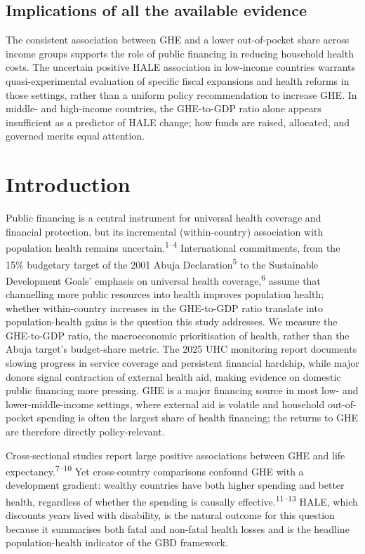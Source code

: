 \documentclass[12pt,a4paper]{article}
\begin{document}
\subsection*{Implications of all the available evidence}
The consistent association between GHE and a lower out-of-pocket share across
income groups supports the role of public financing in reducing household
health costs. The uncertain positive HALE association in low-income countries
warrants quasi-experimental evaluation of specific fiscal expansions and
health reforms in those settings, rather than a uniform policy
recommendation to increase GHE. In middle- and high-income countries, the
GHE-to-GDP ratio alone appears insufficient as a predictor of HALE change;
how funds are raised, allocated, and governed merits equal attention.


\section*{Introduction}

Public financing is a central instrument for universal health coverage and financial protection, but its incremental (within-country) association with population health remains uncertain.\textsuperscript{1--4} International commitments, from the 15\% budgetary target of the 2001 Abuja Declaration\textsuperscript{5} to the Sustainable Development Goals' emphasis on universal health coverage,\textsuperscript{6} assume that channelling more public resources into health improves population health; whether within-country increases in the GHE-to-GDP ratio translate into population-health gains is the question this study addresses. We measure the GHE-to-GDP ratio, the macroeconomic prioritisation of health, rather than the Abuja target's budget-share metric. The 2025 UHC monitoring report documents slowing progress in service coverage and persistent financial hardship, while major donors signal contraction of external health aid, making evidence on domestic public financing more pressing. GHE is a major financing source in most low- and lower-middle-income settings, where external aid is volatile and household out-of-pocket spending is often the largest share of health financing; the returns to GHE are therefore directly policy-relevant.

Cross-sectional studies report large positive associations between GHE and life expectancy.\textsuperscript{7--10} Yet cross-country comparisons confound GHE with a development gradient: wealthy countries have both higher spending and better health, regardless of whether the spending is causally effective.\textsuperscript{11--13} HALE, which discounts years lived with disability, is the natural outcome for this question because it summarises both fatal and non-fatal health losses and is the headline population-health indicator of the GBD framework.
\end{document}
